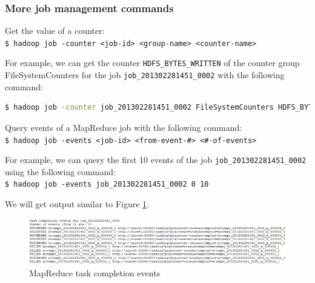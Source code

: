 \subsubsection*{More job management commands}
Get the value of a counter: \\
\verb|$ hadoop job -counter <job-id> <group-name> <counter-name>|

For example, we can get the counter \verb|HDFS_BYTES_WRITTEN| of the counter group FileSystemCounters for the job \verb|job_201302281451_0002| with the following command: 
\lstset{style=bashstyle}
\begin{lstlisting}[language=bash]
$ hadoop job -counter job_201302281451_0002 FileSystemCounters HDFS_BYTES_WRITTEN
\end{lstlisting}

Query events of a MapReduce job with the following command: \\
\verb|$ hadoop job -events <job-id> <from-event-#> <#-of-events>|

For example, we can query the first 10 events of the job \verb|job_201302281451_0002| using the following command: \\
\verb|$ hadoop job -events job_201302281451_0002 0 10|

We will get output similar to Figure \ref{fig:task.events}.
\begin{figure}[ht]
  \centering
  \includegraphics[width=\textwidth]{figs/5163os_04_13.png}
  \caption{MapReduce task completion events}\label{fig:task.events}
\end{figure} 

